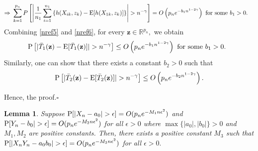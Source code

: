 \documentclass[twoside]{article}
\newcommand{\bz}{\mathbf{z}}
\newcommand{\0}{\mathbf{0}}
\newcommand{\1}{\mathbf{1}}
\newcommand*{\QEDB}{\hfill\ensuremath{\square}}
\numberwithin{equation}{section}
\newtheorem{lemma}[thm]{Lemma}
\begin{document}
\begin{enumerate}[(a)]
\begin{align}
    \Rightarrow &\ \sum\limits_{k=1}^{p_n} P\left [\left |\frac{1}{n_1} \sum_{i=1}^{n_1}\left \{ h(X_{ik},z_k) - {\rm E}[h(X_{1k},z_k)]\right \}\right |> n^{-\gamma}\right ]= O\left (p_n e^{-b_1n^{1-2\gamma}}\right )\text{ for some }b_1>0.
\end{align}
Combining \eqref{nref5} and \eqref{nref6}, for every $\bz\in\mathbb{R}^{p_n},$ we obtain
\begin{align*}
&\ {\rm P}\left [|\bar{T}_{1}(\bz)-{\rm E}[\bar{T}_{1}(\bz)]|>n^{-\gamma} \right ]\leq O\left (p_n e^{-b_1 n^{1-2\gamma}}\right )\text{ for some }b_1>0.
\end{align*}
Similarly, one can show that there exists a constant $b_2>0$ such that
$${\rm P}\left [|\bar{T}_{2}(\bz)-{\rm E}[\bar{T}_{2}(\bz)]|>n^{-\gamma} \right ]\leq O\left (p_n e^{-b_2 n^{1-2\gamma}}\right ).$$
\end{enumerate}
Hence, the proof.\hfill\QEDB

\begin{lemma}\label{supplemma}
Suppose ${\rm P}[|X_n - a_0|>\epsilon] = O(p_n e^{-M_1 n \epsilon^2})$ and ${\rm P}[Y_n - b_0|>\epsilon] = O(p_n e^{-M_2 n \epsilon^2})$ for all $\epsilon >0$ where $\max\{|a_0|,|b_0|\}> 0$ and $M_1,M_2$ are positive constants. Then, there exists a positive constant $M_3$ such that
${\rm P}[|X_nY_n - a_0b_0|>\epsilon] = O(p_n e^{-M_3 n \epsilon^2})$ for all $\epsilon>0.$
\end{lemma}
\end{document}
